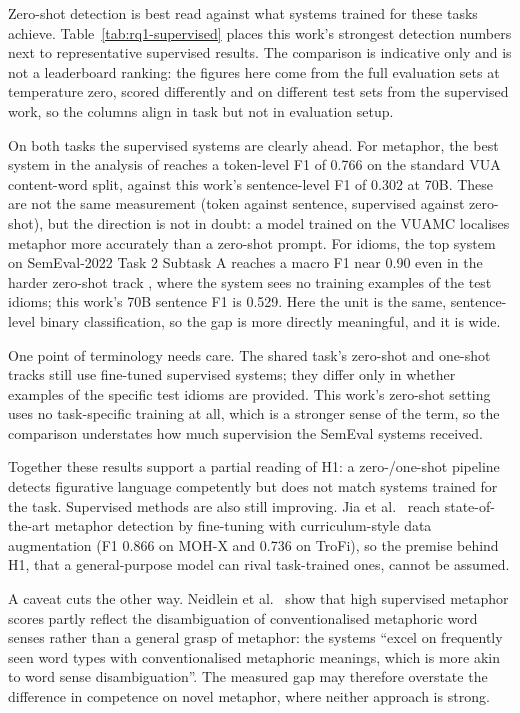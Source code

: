 Zero-shot detection is best read against what systems trained for these tasks achieve. Table~\ref{tab:rq1-supervised} places this work's strongest detection numbers next to representative supervised results. The comparison is indicative only and is not a leaderboard ranking: the figures here come from the full evaluation sets at temperature zero, scored differently and on different test sets from the supervised work, so the columns align in task but not in evaluation setup.

On both tasks the supervised systems are clearly ahead. For metaphor, the best system in the analysis of \cite{Neidlein2020} reaches a token-level F1 of 0.766 on the standard VUA content-word split, against this work's sentence-level F1 of 0.302 at 70B. These are not the same measurement (token against sentence, supervised against zero-shot), but the direction is not in doubt: a model trained on the VUAMC localises metaphor more accurately than a zero-shot prompt. For idioms, the top system on SemEval-2022 Task 2 Subtask A reaches a macro F1 near 0.90 even in the harder zero-shot track \cite{tayyar-madabushi-etal-2022-semeval}, where the system sees no training examples of the test idioms; this work's 70B sentence F1 is 0.529. Here the unit is the same, sentence-level binary classification, so the gap is more directly meaningful, and it is wide.

One point of terminology needs care. The shared task's zero-shot and one-shot tracks still use fine-tuned supervised systems; they differ only in whether examples of the specific test idioms are provided. This work's zero-shot setting uses no task-specific training at all, which is a stronger sense of the term, so the comparison understates how much supervision the SemEval systems received.

Together these results support a partial reading of H1: a zero-/one-shot pipeline detects figurative language competently but does not match systems trained for the task. Supervised methods are also still improving. Jia et al.\ \cite{Jia2024} reach state-of-the-art metaphor detection by fine-tuning with curriculum-style data augmentation (F1 0.866 on MOH-X and 0.736 on TroFi), so the premise behind H1, that a general-purpose model can rival task-trained ones, cannot be assumed.

A caveat cuts the other way. Neidlein et al.\ \cite{Neidlein2020} show that high supervised metaphor scores partly reflect the disambiguation of conventionalised metaphoric word senses rather than a general grasp of metaphor: the systems ``excel on frequently seen word types with conventionalised metaphoric meanings, which is more akin to word sense disambiguation''. The measured gap may therefore overstate the difference in competence on novel metaphor, where neither approach is strong.

